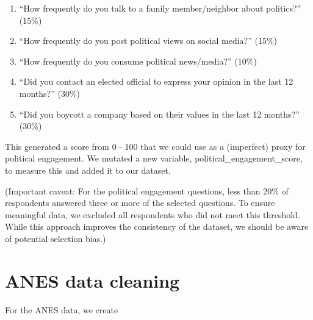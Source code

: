\documentclass[
  letterpaper,
  DIV=11,
  numbers=noendperiod]{scrartcl}
\providecommand{\tightlist}{%
  \setlength{\itemsep}{0pt}\setlength{\parskip}{0pt}}\usepackage{longtable,booktabs,array}
\begin{document}
\begin{enumerate}
\def\labelenumi{\arabic{enumi}.}
\tightlist
\item
  ``How frequently do you talk to a family member/neighbor about
  politics?'' (15\%)
\item
  ``How frequently do you post political views on social media?'' (15\%)
\item
  ``How frequently do you consume political news/media?'' (10\%)
\item
  ``Did you contact an elected official to express your opinion in the
  last 12 months?'' (30\%)
\item
  ``Did you boycott a company based on their values in the last 12
  months?'' (30\%)
\end{enumerate}

This generated a score from 0 - 100 that we could use as a (imperfect)
proxy for political engagement. We mutated a new variable,
political\_engagement\_score, to measure this and added it to our
dataset.

(Important caveat: For the political engagement questions, less than
20\% of respondents answered three or more of the selected questions. To
ensure meaningful data, we excluded all respondents who did not meet
this threshold. While this approach improves the consistency of the
dataset, we should be aware of potential selection bias.)

\section{ANES data cleaning}\label{anes-data-cleaning}

For the ANES data, we create
\end{document}
